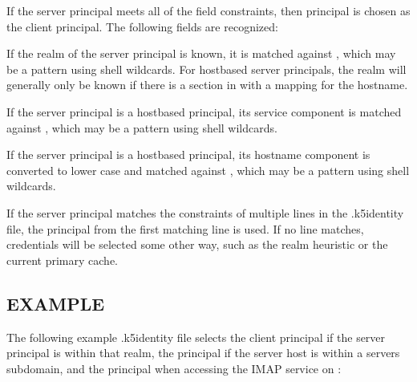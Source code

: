 \documentclass[letterpaper,10pt,english]{sphinxmanual}
\begin{document}
\sphinxAtStartPar
If the server principal meets all of the field constraints, then
principal is chosen as the client principal.  The following fields are
recognized:
\begin{description}
\sphinxAtStartPar
If the realm of the server principal is known, it is matched
against , which may be a pattern using shell wildcards.
For host\sphinxhyphen{}based server principals, the realm will generally only be
known if there is a  section in
 with a mapping for the hostname.

\sphinxAtStartPar
If the server principal is a host\sphinxhyphen{}based principal, its service
component is matched against , which may be a pattern using
shell wildcards.

\sphinxAtStartPar
If the server principal is a host\sphinxhyphen{}based principal, its hostname
component is converted to lower case and matched against ,
which may be a pattern using shell wildcards.

\sphinxAtStartPar
If the server principal matches the constraints of multiple lines
in the .k5identity file, the principal from the first matching
line is used.  If no line matches, credentials will be selected
some other way, such as the realm heuristic or the current primary
cache.

\end{description}


\subsection{EXAMPLE}
\label{\detokenize{user/user_config/k5identity:example}}
\sphinxAtStartPar
The following example .k5identity file selects the client principal
 if the server principal is within that realm,
the principal  if the server host is within
a servers subdomain, and the principal  when
accessing the IMAP service on :

\begin{sphinxVerbatim}[commandchars=\\\{\}]
       
  
   
\end{sphinxVerbatim}
\end{document}
